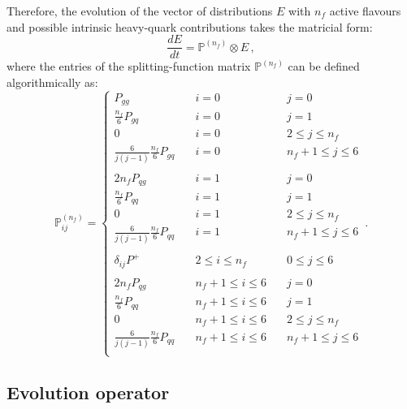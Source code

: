 \documentclass[10pt,a4paper]{article}
\begin{document}
Therefore, the evolution of the vector of distributions $E$ with $n_f$
active flavours and possible intrinsic heavy-quark contributions takes
the matricial form:
\begin{equation}
\frac{dE}{dt} = \mathbb{P}^{(n_f)}\otimes E\,,
\label{eq:DGLAPE}
\end{equation}
where the entries of the splitting-function matrix
$\mathbb{P}^{(n_f)}$ can be defined algorithmically as:
\begin{equation}
\mathbb{P}_{ij}^{(n_f)}=
\left\{
\begin{array}{lll}
P_{gg} & \quad i = 0 &\quad j = 0\\
\frac{n_f}{6}P_{gq} & \quad i = 0 & \quad j=1\\
0 &\quad i = 0 & \quad 2 \leq j \leq n_f\\
\frac{6}{j(j-1)}\frac{n_f}{6}P_{gq} &\quad i = 0 & \quad n_f+1 \leq j \leq 6\\
\\
2n_fP_{qg} & \quad i = 1 &\quad j = 0\\
\frac{n_f}{6}P_{qq} & \quad i = 1 & \quad j=1\\
0 &\quad i = 1 & \quad 2 \leq j \leq n_f\\
\frac{6}{j(j-1)}\frac{n_f}{6}P_{qq} &\quad i = 1 & \quad n_f+1 \leq j \leq 6\\
\\
\delta_{ij}P^+ & \quad 2 \leq i \leq n_f & \quad 0 \leq j \leq 6\\
\\
2n_fP_{qg} & \quad n_f+1 \leq i \leq 6  &\quad j = 0\\
\frac{n_f}{6}P_{qq} & \quad n_f+1 \leq i \leq 6  & \quad j=1\\
0 &\quad n_f+1 \leq i \leq 6 & \quad 2 \leq j \leq n_f\\
\frac{6}{j(j-1)}\frac{n_f}{6}P_{qq} &\quad n_f+1 \leq i \leq 6 & \quad n_f+1 \leq j \leq 6\\
\end{array}
\right.\,.
\label{eq:splittingalg}
\end{equation}

\subsection{Evolution operator}
\end{document}
